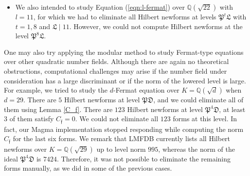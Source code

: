 \documentclass[]{article}
\newcommand {\QQ}{{\mathbb{Q}}}
\newcommand {\mfp}{{\mathfrak{P}}}
\newcounter{cases}
\begin{document}
\begin{itemize}
    $$
\bar{\rho}_{E^{\prime}, p} \sim\theta|_{G_L}\cdot\bar{\rho}_{E, p}\sim\left(\begin{array}{cc}
\theta^2 & * \\
0 & \theta\theta^{\prime}
\end{array}\right)\sim\left(\begin{array}{cc}
1 & * \\
0 & \chi_p
\end{array}\right).
$$Therefore, $E^{\prime}$ has a point of order $p$ over $L$. The work \cite{derickx2023torsion} forces $p\le 17$. We reach a contradiction as we assumed $p\ge 19$. Now, applying Theorem \ref{levellow} yields that we need to eliminate Hilbert newforms at the levels $\mfp^t\mathfrak{L}$, where $t=1,8$ and $\mathfrak{L}\mid l$. When $d=6$, no Hilbert newforms at the level $\mfp\mathfrak{L}$ and there are $34$ Hilbert newforms at the level $\mfp^8\mathfrak{L}$. Among those $34$ newforms, $20$ of them -having LMFB labels $2.2.24.1-768.1-a,\ldots,-t$- are rational and they can be eliminated via Lemma \ref{lemma:imageofinertia}, namely the inertia argument. The remaining $14$ are irrational. Applying Lemma \ref{C_f} shows that $C_\mathfrak{f}$ is divisible by $2$ or $5$. When $d=14$, there are $4$ Hilbert newforms at the level $\mfp\mathfrak{L}$, and $200$ Hilbert newforms at the level $\mfp^8\mathfrak{L}$. Performing Magma computations to apply Lemma \ref{C_f} shows that the norm $C_\mathfrak{f}$ is divisible by $2,3,5$ or $11$ for each Hilbert newform $\mathfrak{f}$.

\item We also intended to study Equation (\ref{eqn:l-fermat}) over $\QQ(\sqrt{22})$ with $l=11$, for which we had to eliminate all Hilbert newforms at levels $\mfp^t\mathfrak{L}$ with $t=1,8$ and $\mathfrak{L}\mid 11$. However, we could not compute Hilbert newforms at the level $\mfp^8\mathfrak{L}$.
\end{itemize}

    

One may also try applying the modular method to study Fermat-type equations over other quadratic number fields. Although there are again no theoretical obstructions, computational challenges may arise if the number field under consideration has a large discriminant or if the norm of the lowered level is large. For example, we tried to study the $d$-Fermat equation over $K=\QQ(\sqrt{d})$ when $d=29$. There are $5$ Hilbert newforms at level $\mfp\mathfrak{D}$, and we could eliminate all of them using Lemma \ref{C_f}. There are $123$ Hilbert newforms at level $\mfp^4\mathfrak{D}$, at least $3$ of them satisfy $C_\mathfrak{f}=0$. We could not eliminate all $123$ forms at this level. In fact, our Magma implementation stopped responding while computing the norm $C_\mathfrak{f}$ for the last six forms. We remark that LMFDB currently lists all Hilbert newforms over $K=\QQ(\sqrt{29})$ up to level norm $995$, whereas the norm of the ideal $\mfp^4\mathfrak{D}$ is $7424$. Therefore, it was not possible to eliminate the remaining forms manually, as we did in some of the previous cases. 
\end{document}
